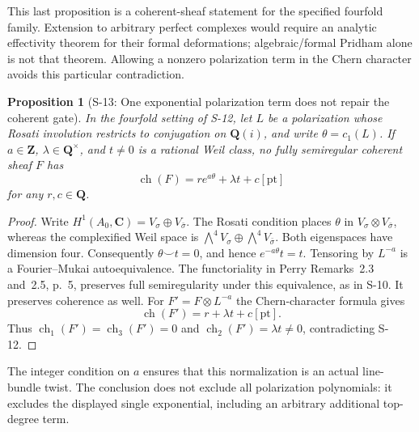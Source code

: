 \documentclass[11pt,a4paper]{article}
\newtheorem{proposition}[theorem]{Proposition}
\theoremstyle{definition}
\begin{document}
This last proposition is a coherent-sheaf statement for the
specified fourfold family. Extension to arbitrary perfect complexes
would require an analytic effectivity theorem for their formal
deformations; algebraic/formal Pridham alone is not that theorem.
Allowing a nonzero polarization term in the Chern character
avoids this particular contradiction.

\begin{proposition}[S-13: One exponential polarization term does not repair the coherent gate]
\label{prop:semireg-single-exponential-no-go}
In the fourfold setting of S-12, let $L$ be a polarization whose
Rosati involution restricts to conjugation on $\mathbf Q(i)$, and
write $\theta=c_1(L)$. If $a\in\mathbf Z$, $\lambda\in\mathbf Q^\times$,
and $t\ne0$ is a rational Weil class, no fully semiregular coherent
sheaf $F$ has
\[
 \operatorname{ch}(F)=r e^{a\theta}+\lambda t+c[\mathrm{pt}]
\]
for any $r,c\in\mathbf Q$.
\end{proposition}
\begin{proof}
Write $H^1(A_0,\mathbf C)=V_\sigma\oplus V_{\bar\sigma}$.
The Rosati condition places $\theta$ in
$V_\sigma\otimes V_{\bar\sigma}$, whereas the complexified Weil
space is
$\bigwedge^4V_\sigma\oplus\bigwedge^4V_{\bar\sigma}$.
Both eigenspaces have dimension four. Consequently
$\theta\smile t=0$, and hence $e^{-a\theta}t=t$.
Tensoring by $L^{-a}$ is a Fourier--Mukai autoequivalence.
The functoriality in Perry Remarks~2.3 and~2.5, p.~5, preserves
full semiregularity under this equivalence, as in S-10.
It preserves coherence as well.
For $F'=F\otimes L^{-a}$ the Chern-character formula gives
\[
 \operatorname{ch}(F')=r+\lambda t+c[\mathrm{pt}].
\]
Thus $\operatorname{ch}_1(F')=\operatorname{ch}_3(F')=0$ and
$\operatorname{ch}_2(F')=\lambda t\ne0$, contradicting S-12.
\end{proof}

The integer condition on $a$ ensures that this normalization is an
actual line-bundle twist. The conclusion does not exclude all
polarization polynomials: it excludes the displayed single
exponential, including an arbitrary additional top-degree term.
\end{document}
